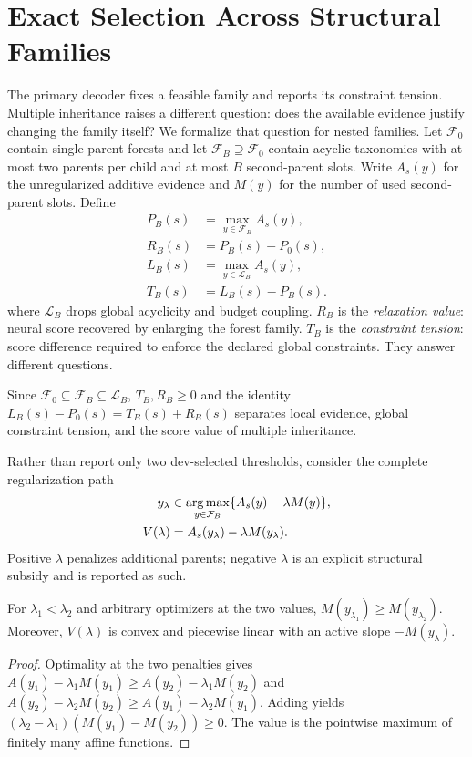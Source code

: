 \section{Exact Selection Across Structural Families}
\label{app:family-selection}

The primary decoder fixes a feasible family and reports its constraint tension.
Multiple inheritance raises a different question: does the
available evidence justify changing the family itself?  We formalize that
question for nested families.  Let $\mathcal F_0$ contain single-parent
forests and let $\mathcal F_B\supseteq\mathcal F_0$ contain acyclic
taxonomies with at most two parents per child and at most $B$ second-parent
slots.  Write $A_s(y)$ for the unregularized additive evidence and
$M(y)$ for the number of used second-parent slots.  Define
\begin{align}
 P_B(s)&=\max_{y\in\mathcal F_B} A_s(y),\\
 R_B(s)&=P_B(s)-P_0(s),\label{eq:relaxation-value}\\
 L_B(s)&=\max_{y\in\mathcal L_B} A_s(y),\\
 T_B(s)&=L_B(s)-P_B(s).\label{eq:family-tension}
\end{align}
where $\mathcal L_B$ drops global acyclicity and budget coupling.
$R_B$ is the \emph{relaxation value}: neural score recovered by enlarging
the forest family. $T_B$ is the \emph{constraint tension}: score difference required
to enforce the declared global constraints.  They answer different questions.

Since $\mathcal F_0\subseteq\mathcal F_B\subseteq\mathcal L_B$,
$T_B,R_B\geq0$ and the identity
$L_B(s)-P_0(s)=T_B(s)+R_B(s)$ separates local evidence, global constraint
tension, and the score value of multiple inheritance.

Rather than report only two dev-selected thresholds, consider the complete
regularization path
\begin{align}
 y_\lambda&\in\operatorname*{arg\,max}_{y\in\mathcal F_B}
 \{A_s(y)-\lambda M(y)\},\\
 V(\lambda)&=A_s(y_\lambda)-\lambda M(y_\lambda).
 \label{eq:family-path}
\end{align}
Positive $\lambda$ penalizes additional parents; negative $\lambda$ is an
explicit structural subsidy and is reported as such.

\begin{proposition}
For $\lambda_1<\lambda_2$ and arbitrary optimizers at the two values,
$M(y_{\lambda_1})\geq M(y_{\lambda_2})$.  Moreover, $V(\lambda)$ is
convex and piecewise linear with an active slope $-M(y_\lambda)$.
\end{proposition}
\begin{proof}
Optimality at the two penalties gives
$A(y_1)-\lambda_1M(y_1)\geq A(y_2)-\lambda_1M(y_2)$ and
$A(y_2)-\lambda_2M(y_2)\geq A(y_1)-\lambda_2M(y_1)$.
Adding yields
$(\lambda_2-\lambda_1)(M(y_1)-M(y_2))\geq0$.
The value is the pointwise maximum of finitely many affine functions.
\end{proof}

